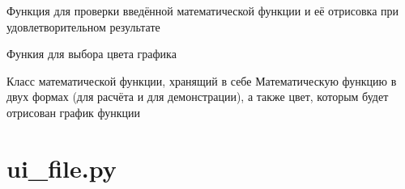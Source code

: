 \documentclass[letterpaper,10pt,russian]{sphinxmanual}
\begin{document}
\begin{fulllineitems}
\begin{fulllineitems}
\label{\detokenize{src:main.GraphicCalculator.revise_function}}
\pysigstartsignatures
\pysiglinewithargsret
{}
{}
{}
\pysigstopsignatures
\sphinxAtStartPar
Функция для проверки введённой математической функции и её отрисовка при удовлетворительном результате

\end{fulllineitems}


\begin{fulllineitems}
\label{\detokenize{src:main.GraphicCalculator.select_func_color}}
\pysigstartsignatures
\pysiglinewithargsret
{}
{}
{}
\pysigstopsignatures
\sphinxAtStartPar
Функия для выбора цвета графика 

\end{fulllineitems}


\end{fulllineitems}


\begin{fulllineitems}
\label{\detokenize{src:main.MathFunction}}
\pysigstartsignatures
\pysiglinewithargsret
{}
{\sphinxparamcomma {}\sphinxparamcomma {}}
{}
\pysigstopsignatures
\sphinxAtStartPar
Класс математической функции, хранящий в себе Математическую функцию в двух формах (для расчёта и для демонстрации), а также цвет, которым будет отрисован график функции

\end{fulllineitems}



\section{ui\_file.py}
\label{\detokenize{src:module-ui_file}}\label{\detokenize{src:ui-file-py}}

\renewcommand{\indexname}{Содержание модулей Python}
\begin{sphinxtheindex}
\let\bigletter\sphinxstyleindexlettergroup
\bigletter{m}
\item\relax{}
\indexspace
\bigletter{u}
\item\relax{}
\end{sphinxtheindex}

\renewcommand{\indexname}{Алфавитный указатель}
\printindex
\end{document}
